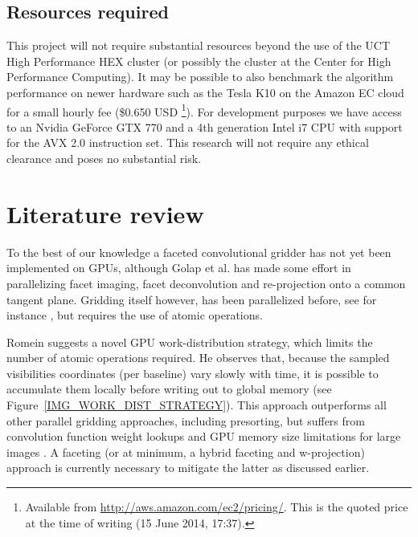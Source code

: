 \documentclass[a4paper, two column]{article}
\begin{document}
\subsection{Resources required} 
This project will not require substantial resources beyond the use of the UCT High Performance HEX cluster (or possibly the cluster at the Center for High Performance Computing). It may be possible to also benchmark the algorithm performance
on newer hardware such as the Tesla K10 on the Amazon EC cloud for a small hourly fee (\$0.650 USD \footnote{Available from \url{http://aws.amazon.com/ec2/pricing/}. This is the quoted price at the time of writing (15 June 2014, 17:37).}). For development purposes we have 
access to an Nvidia GeForce GTX 770 and a 4th generation Intel i7 CPU with support for the AVX 2.0 instruction set. This research will not require any ethical clearance and poses no substantial risk.

\section{Literature review}
To the best of our knowledge a faceted convolutional gridder has not yet been implemented on GPUs, although Golap et al. \cite{golap2001parallelization} has 
made some effort in parallelizing facet imaging, facet deconvolution and re-projection onto a common tangent plane. Gridding itself however, has been parallelized 
before, see for instance \cite{varbanescu2008performance,romein2012efficient,muscat2014high}, but requires the use of atomic operations.
 
Romein \cite{romein2012efficient} suggests a novel GPU work-distribution strategy, which limits the number of atomic operations required. He observes that, because 
the sampled visibilities coordinates (per baseline) vary slowly with time, it is possible to accumulate them locally before writing out to global memory (see 
Figure~\ref{IMG_WORK_DIST_STRATEGY}). This approach outperforms all other parallel gridding approaches, including presorting, but suffers from convolution function 
weight lookups and GPU memory size limitations for large images \cite{muscat2014high}. A faceting (or at minimum, a hybrid faceting and w-projection) approach is currently 
necessary to mitigate the latter as discussed earlier.
\end{document}
